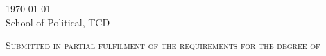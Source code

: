 \begin{titlepage}
    \textsc{{\large \today}}\\[2cm] %
    
    {School of Political, TCD}
    \vfill
    
    \textsc{\normalsize Submitted in partial fulfilment of the requirements for the degree of \\
    \degree}
    
    \vfill %
    
\end{titlepage}